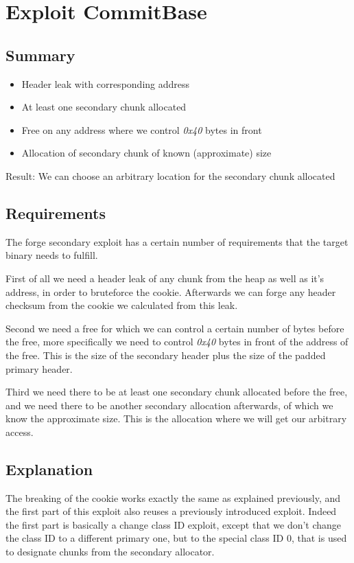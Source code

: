 \documentclass[a4paper,11pt,oneside]{report}
\begin{document}
\section{Exploit CommitBase}

\subsection{Summary}

\begin{itemize}
\item Header leak with corresponding address
\item At least one secondary chunk allocated
\item Free on any address where we control \emph{0x40} bytes in front
\item Allocation of secondary chunk of known (approximate) size
\end{itemize}

Result: We can choose an arbitrary location for the secondary chunk allocated

\subsection{Requirements}

The forge secondary exploit has a certain number of requirements that the target binary
needs to fulfill.

First of all we need a header leak of any chunk from the heap as well as it's address, in
order to bruteforce the cookie. Afterwards we can forge any header checksum from the
cookie we calculated from this leak.

Second we need a free for which we can control a certain number of bytes before the free,
more specifically we need to control \emph{0x40} bytes in front of the address of the
free. This is the size of the secondary header plus the size of the padded primary header.

Third we need there to be at least one secondary chunk allocated before the free, and we
need there to be another secondary allocation afterwards, of which we know the approximate
size. This is the allocation where we will get our arbitrary access.

\subsection{Explanation}

The breaking of the cookie works exactly the same as explained previously, and the first
part of this exploit also reuses a previously introduced exploit. Indeed the first part is
basically a change class ID exploit, except that we don't change the class ID to a
different primary one, but to the special class ID 0, that is used to designate chunks
from the secondary allocator.
\end{document}

